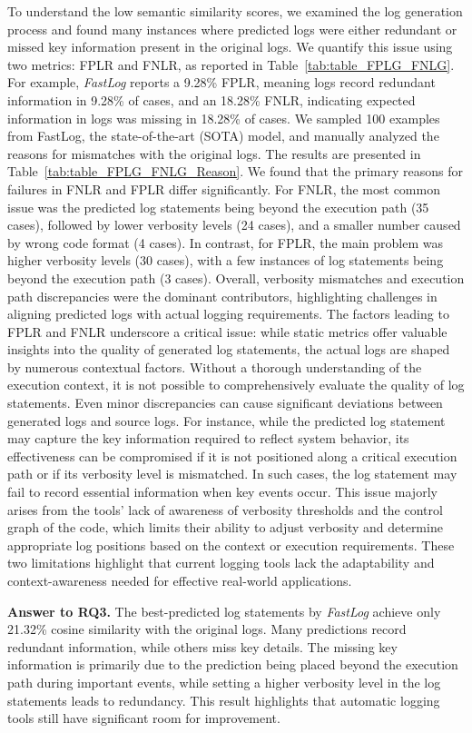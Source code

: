 To understand the low semantic similarity scores, we examined the log generation process and found many instances where predicted logs were either redundant or missed key information present in the original logs. We quantify this issue using two metrics: FPLR and FNLR, as reported in Table~\ref{tab:table_FPLG_FNLG}. For example, \textit{FastLog} reports a 9.28\% FPLR, meaning logs record redundant information in 9.28\% of cases, and an 18.28\% FNLR, indicating expected information in logs was missing in 18.28\% of cases. We sampled 100 examples from FastLog, the state-of-the-art (SOTA) model, and manually analyzed the reasons for mismatches with the original logs. The results are presented in Table~\ref{tab:table_FPLG_FNLG_Reason}. We found that the primary reasons for failures in FNLR and FPLR differ significantly. For FNLR, the most common issue was the predicted log statements being beyond the execution path (35 cases), followed by lower verbosity levels (24 cases), and a smaller number caused by wrong code format (4 cases). In contrast, for FPLR, the main problem was higher verbosity levels (30 cases), with a few instances of log statements being beyond the execution path (3 cases). Overall, verbosity mismatches and execution path discrepancies were the dominant contributors, highlighting challenges in aligning predicted logs with actual logging requirements. The factors leading to FPLR and FNLR underscore a critical issue: while static metrics offer valuable insights into the quality of generated log statements, the actual logs are shaped by numerous contextual factors. Without a thorough understanding of the execution context, it is not possible to comprehensively evaluate the quality of log statements. Even minor discrepancies can cause significant deviations between generated logs and source logs. For instance, while the predicted log statement may capture the key information required to reflect system behavior, its effectiveness can be compromised if it is not positioned along a critical execution path or if its verbosity level is mismatched. In such cases, the log statement may fail to record essential information when key events occur. This issue majorly arises from the tools’ lack of awareness of verbosity thresholds and the control graph of the code, which limits their ability to adjust verbosity and determine appropriate log positions based on the context or execution requirements. These two limitations highlight that current logging tools lack the adaptability and context-awareness needed for effective real-world applications.

\begin{tcolorbox}
    \textbf{Answer to RQ3.} The best-predicted log statements by \textit{FastLog} achieve only 21.32\% cosine similarity with the original logs. Many predictions record redundant information, while others miss key details. The missing key information is primarily due to the prediction being placed beyond the execution path during important events, while setting a higher verbosity level in the log statements leads to redundancy. This result highlights that automatic logging tools still have significant room for improvement.
\end{tcolorbox}



